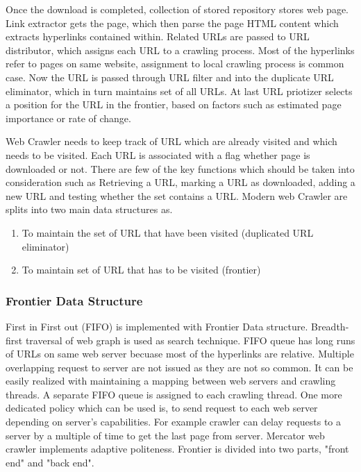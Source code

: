 \documentclass[article,type=msc,colorback,accentcolor=tud9c,twoside,11pt]{tudthesis}
\begin{document}
 Once the download is completed, collection of stored repository stores web page. Link extractor gets the page, which then parse the page HTML content which extracts hyperlinks contained within. Related URLs are passed to URL distributor, which assigns each URL to a crawling process. Most of the hyperlinks refer to pages on same website, assignment to local crawling process is common case. Now the URL is passed through URL filter and into the duplicate URL eliminator, which in turn maintains set of all URLs.  At last URL priotizer selects a position for the URL in the frontier, based on factors such as estimated page importance or rate of change.
 
Web Crawler needs to keep track of URL which are already visited and which needs to be visited. Each URL is associated with a flag whether page is downloaded or not. There are few of the key functions which should be taken into consideration such as Retrieving a URL, marking a URL as downloaded, adding a new URL and testing whether the set contains a URL. Modern web Crawler are splits into two main data structures as. 
 \begin{enumerate}
\item To maintain the set of URL that have been visited (duplicated URL eliminator)
\item To maintain set of URL that has to be visited (frontier)
\end{enumerate}

\subsubsection{Frontier Data Structure}
First in First out (FIFO) is implemented with  Frontier \cite{frontierdatastructures} Data structure. Breadth-first traversal of web graph is used as search technique. FIFO queue has long runs of URLs on same web server becuase most of the  hyperlinks are relative. Multiple overlapping request to server are not issued as they are not so common. It can be easily realized with maintaining a mapping between web servers and crawling threads. A separate FIFO queue is assigned to each crawling thread. One more dedicated policy which can be used is, to send request to each web server depending on server's capabilities. For example crawler can delay requests to a server by a multiple of time to get the last page from server. Mercator web crawler implements adaptive politeness. Frontier is divided into two parts, "front end" and "back end".
\end{document}
